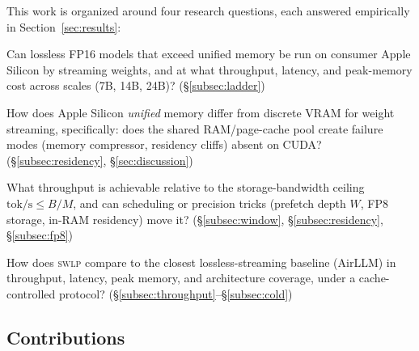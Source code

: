 \documentclass[10pt,a4paper]{article}
\newcommand{\swlp}{\textsc{swlp}}
\begin{document}
This work is organized around four research questions, each answered empirically
in Section~\ref{sec:results}:

\begin{description}[leftmargin=2.2em,style=nextline]
  \item[\textbf{RQ1}] Can lossless FP16 models that exceed unified memory be run
    on consumer Apple Silicon by streaming weights, and at what throughput,
    latency, and peak-memory cost across scales (7B, 14B, 24B)?
    (\S\ref{subsec:ladder})
  \item[\textbf{RQ2}] How does Apple Silicon \emph{unified} memory differ from
    discrete VRAM for weight streaming, specifically: does the shared
    RAM/page-cache pool create failure modes (memory compressor, residency
    cliffs) absent on CUDA? (\S\ref{subsec:residency}, \S\ref{sec:discussion})
  \item[\textbf{RQ3}] What throughput is achievable relative to the
    storage-bandwidth ceiling $\text{tok/s}\le B/M$, and can scheduling or
    precision tricks (prefetch depth $W$, FP8 storage, in-RAM residency)
    move it? (\S\ref{subsec:window}, \S\ref{subsec:residency}, \S\ref{subsec:fp8})
  \item[\textbf{RQ4}] How does \swlp{} compare to the closest lossless-streaming
    baseline (AirLLM) in throughput, latency, peak memory, and architecture
    coverage, under a cache-controlled protocol? (\S\ref{subsec:throughput}--\S\ref{subsec:cold})
\end{description}

\subsection{Contributions}
\label{subsec:contrib}
\end{document}

